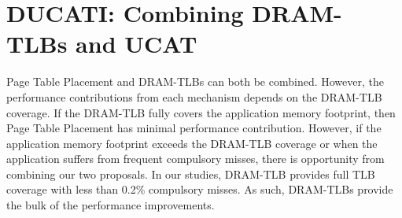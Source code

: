 \section{DUCATI: Combining DRAM-TLBs \newline and UCAT}
\label{sec:DUCATI}

 Page Table
Placement and DRAM-TLBs can both be combined. However, the performance
contributions from each mechanism depends on the DRAM-TLB coverage. If
the DRAM-TLB fully covers the application memory footprint, then Page
Table Placement has minimal performance contribution. However, if the
application memory footprint exceeds the DRAM-TLB coverage or when the
application suffers from frequent compulsory misses, there is
opportunity from combining our two proposals. In our studies, DRAM-TLB
provides full TLB coverage with less than 0.2\% compulsory misses. As
such, DRAM-TLBs provide the bulk of the performance improvements.


